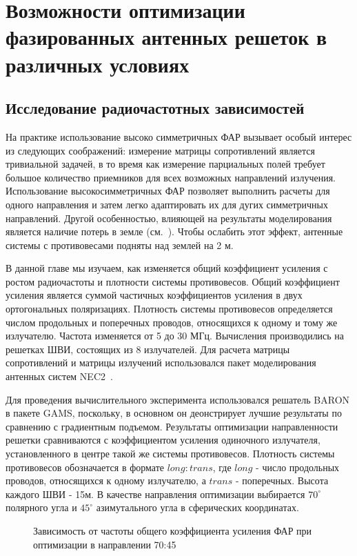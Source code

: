 \chapter{Возможности оптимизации фазированных антенных решеток в различных условиях}\label{sec:radio}

\section{Исследование радиочастотных зависимостей}
 На практике использование высоко симметричных ФАР вызывает особый интерес из следующих соображений: измерение матрицы сопротивлений является тривиальной задачей, в то время как измерение парциальных полей требует большое количество приемников для всех возможных направлений излучения. Использование высокосимметричных ФАР позволяет выполнить расчеты для одного направления и затем легко адаптировать их для дугих симметричных направлений. Другой особенностью, влияющей на результаты моделирования является наличие потерь в земле (см.~\cite{yurkov:groundloss}). Чтобы ослабить этот эффект, антенные системы с противовесами подняты над землей на 2 м.

В данной главе мы изучаем, как изменяется общий коэффициент усиления с ростом радиочастоты и плотности системы противовесов. Общий коэффициент усиления является суммой частичных коэффициентов усиления в  двух ортогональных поляризациях. Плотность системы противовесов определяется числом продольных и поперечных проводов, относящихся к одному и тому же излучателю. Частота изменяется от 5 до 30 МГц. Вычисления производились на решетках ШВИ, состоящих из 8 излучателей. Для расчета матрицы сопротивлений и матрицы излучений использовался пакет моделирования антенных систем NEC2~\cite{bruke:nec2}.

Для проведения вычислительного эксперимента использовался решатель BARON в пакете GAMS, поскольку, в основном он деонстрирует лучшие результаты по сравнению с градиентным подъемом. Результаты оптимизации направленности решетки сравниваются с коэффициентом усиления одиночного излучателя, установленного в центре такой же системы противовесов. Плотность системы противовесов обозначается в формате $long:trans$, где $long$ - число продольных проводов, относящихся к одному излучателю, а $trans$ - поперечных. Высота каждого ШВИ - 15м. В качестве направления оптимизации выбирается $70^{\circ}$ полярного угла и $45^{\circ}$ азимутального угла в сферических координатах.

\begin{figure}
\caption{Зависимость от частоты общего коэффициента усиления ФАР при оптимизации в направлении 70:45}
\label{ris:paa_gains}
\end{figure}

